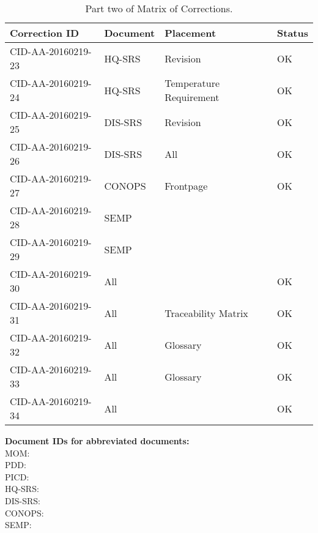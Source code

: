 \begin{table}[ht]
\centering
\begin{tabular}{|>{\centering\arraybackslash}p{4.5cm}|>{\centering\arraybackslash}p{2cm}|>{\centering\arraybackslash}p{3cm}|>{\centering\arraybackslash}p{3cm}|}
\hline \textbf{Correction ID} & \textbf{Document} & \textbf{Placement} & \textbf{Status} \\ 
\hline CID-AA-20160219-23 & HQ-SRS & Revision & OK \\ 
\hline CID-AA-20160219-24 & HQ-SRS & Temperature Requirement & OK \\ 
\hline CID-AA-20160219-25 & DIS-SRS & Revision & OK\\ 
\hline CID-AA-20160219-26 & DIS-SRS & All & OK \\ 
\hline CID-AA-20160219-27 & CONOPS & Frontpage & OK \\ 
\hline CID-AA-20160219-28 & SEMP &  & \\ 
\hline CID-AA-20160219-29 & SEMP &  & \\ 
\hline CID-AA-20160219-30 & All &  & OK\\ 
\hline CID-AA-20160219-31 & All & Traceability Matrix & OK\\ 
\hline CID-AA-20160219-32 & All & Glossary & OK\\ 
\hline CID-AA-20160219-33 & All & Glossary & OK\\ 
\hline CID-AA-20160219-34 & All &  & OK\\
\hline 
\end{tabular}
\caption{Part two of Matrix of Corrections.}
\label{tb:MoC2} 
\end{table}

\vspace{20pt}
\noindent \textbf{Document IDs for abbreviated documents:}\\
MOM:        \mom \\
PDD:        \pdd \\
PICD:       \picd \\
HQ-SRS:     \srshq \\
DIS-SRS:    \srsdis \\
CONOPS:     \conops \\
SEMP:       \semp \\

